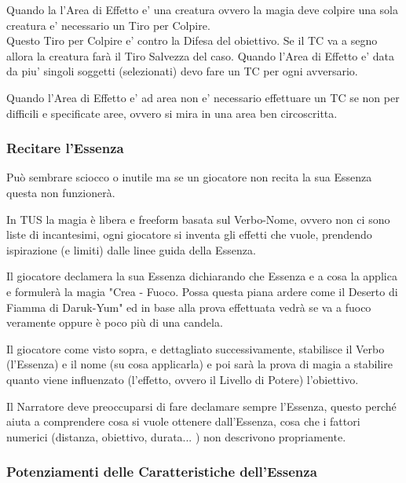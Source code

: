 \documentclass[a4paper,10 pt,twoside,openany]{book}
\begin{document}
Quando la l'Area di Effetto e' una creatura ovvero la magia deve colpire una sola creatura e' necessario un Tiro per Colpire.\\
Questo Tiro per Colpire e' contro la Difesa del obiettivo. Se il TC va a segno allora la creatura farà il Tiro Salvezza del caso.
Quando l'Area di Effetto e' data da piu' singoli soggetti (selezionati) devo fare un TC per ogni avversario.

Quando l'Area di Effetto e' ad area non e' necessario effettuare un TC se non per difficili e specificate aree, ovvero si mira in una area ben circoscritta.


\subsubsection{Recitare l'Essenza}

\label{recitare-lessenza}

Può sembrare sciocco o inutile ma se un giocatore non recita la sua Essenza questa non funzionerà.

In TUS la magia è libera e freeform basata sul Verbo-Nome, ovvero non ci sono liste di incantesimi, ogni giocatore si inventa gli effetti che vuole, prendendo ispirazione (e limiti) dalle linee guida della Essenza.

Il giocatore declamera la sua Essenza dichiarando che Essenza e a cosa la applica e formulerà la magia "Crea - Fuoco. Possa questa piana ardere come il Deserto di Fiamma di Daruk-Yum" ed in base alla prova effettuata vedrà se va a fuoco veramente oppure è poco più di una candela.

Il giocatore come visto sopra, e dettagliato successivamente, stabilisce il Verbo (l'Essenza) e il nome (su cosa applicarla) e poi sarà la prova di magia a stabilire quanto viene influenzato (l'effetto, ovvero il Livello di Potere) l'obiettivo.

Il Narratore deve preoccuparsi di fare declamare sempre l'Essenza, questo perché aiuta a comprendere cosa si vuole ottenere dall'Essenza, cosa che i fattori numerici (distanza, obiettivo, durata... ) non descrivono propriamente.

\subsubsection{Potenziamenti delle Caratteristiche dell'Essenza}

\label{potenziamenti-delle-caratteristiche-dellessenza}
\end{document}
